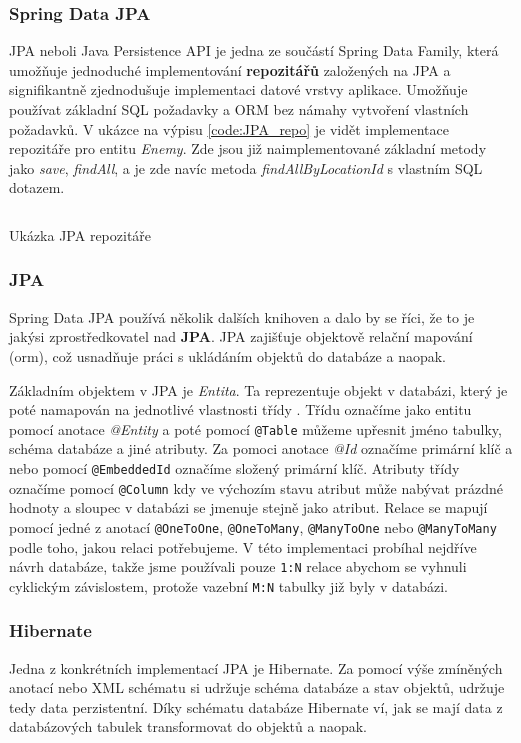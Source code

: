 \subsubsection*{Spring Data JPA}
JPA neboli Java Persistence API je jedna ze součástí Spring Data Family, která umožňuje jednoduché implementování \textbf{repozitářů} založených na JPA a signifikantně zjednodušuje implementaci datové vrstvy aplikace. Umožňuje používat základní SQL požadavky a ORM bez námahy vytvoření vlastních požadavků. V ukázce na výpisu \ref{code:JPA_repo} je vidět implementace repozitáře pro entitu \textit{Enemy}. Zde jsou již naimplementované základní metody jako \textit{save}, \textit{findAll}, a je zde navíc metoda \textit{findAllByLocationId} s vlastním SQL dotazem.

\begin{listing}[ht!]
    \inputminted[]{Java}{resources/code/impl/EnemyRepo.java}
    \caption{Ukázka JPA repozitáře}
    \label{code:JPA_repo}
\end{listing}

\subsubsection*{JPA}
Spring Data JPA používá několik dalších knihoven a dalo by se říci, že to je jakýsi zprostředkovatel nad \textbf{JPA}. JPA zajišťuje objektově relační mapování (\gls{orm}), což usnadňuje práci s ukládáním objektů do databáze a naopak.

Základním objektem v JPA je \textit{Entita}. Ta reprezentuje objekt v databázi, který je poté namapován na jednotlivé vlastnosti třídy . Třídu označíme jako entitu pomocí anotace \textit{@Entity} a poté pomocí \texttt{@Table} můžeme upřesnit jméno tabulky, schéma databáze a jiné atributy. Za pomoci anotace \textit{@Id} označíme primární klíč a nebo pomocí \texttt{@EmbeddedId} označíme složený primární klíč. Atributy třídy označíme pomocí \texttt{@Column} kdy ve výchozím stavu atribut může nabývat prázdné hodnoty a sloupec v databázi se jmenuje stejně jako atribut. Relace se mapují pomocí jedné z anotací \texttt{@OneToOne}, \texttt{@OneToMany}, \texttt{@ManyToOne} nebo \texttt{@ManyToMany} podle toho, jakou relaci potřebujeme. V této implementaci probíhal nejdříve návrh databáze, takže jsme používali pouze \texttt{1:N} relace abychom se vyhnuli cyklickým závislostem, protože vazební \texttt{M:N} tabulky již byly v databázi.

\subsubsection*{Hibernate}\label{sec:impl:hibernate}
Jedna z konkrétních implementací JPA je Hibernate. Za pomocí výše zmíněných anotací nebo XML  schématu si udržuje schéma databáze a stav objektů, udržuje tedy data perzistentní. Díky schématu databáze Hibernate ví, jak se mají data z databázových tabulek transformovat do objektů a naopak. \cite[]{enwiki:1217225259}

